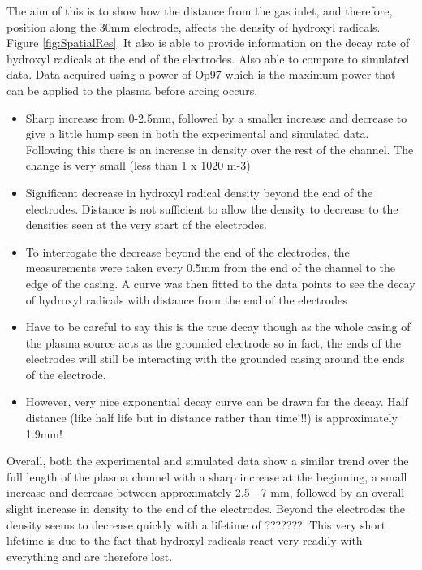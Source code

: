 \documentclass[11pt, oneside]{article}   	%
\begin{document}
The aim of this is to show how the distance from the gas inlet, and therefore, position along the 30mm electrode, affects the density of hydroxyl radicals. Figure \ref{fig:SpatialRes}.
It also is able to provide information on the decay rate of hydroxyl radicals at the end of the electrodes.
Also able to compare to simulated data.
Data acquired using a power of Op97 which is the maximum power that can be applied to the plasma before arcing occurs.
\begin{itemize}
    \item Sharp increase from 0-2.5mm, followed by a smaller increase and decrease to give a little hump seen in both the experimental and simulated data. Following this there is an increase in density over the rest of the channel. The change is very small (less than 1 x 1020 m-3)
   
    \item Significant decrease in hydroxyl radical density beyond the end of the electrodes. Distance is not sufficient to allow the density to decrease to the densities seen at the very start of the electrodes. 
        
    \item To interrogate the decrease beyond the end of the electrodes, the measurements were taken every 0.5mm from the end of the channel to the edge of the casing. A curve was then fitted to the data points to see the decay of hydroxyl radicals with distance from the end of the electrodes
    
    \item Have to be careful to say this is the true decay though as the whole casing of the plasma source acts as the grounded electrode so in fact, the ends of the electrodes will still be interacting with the grounded casing around the ends of the electrode.
    
    \item However, very nice exponential decay curve can be drawn for the decay. Half distance (like half life but in distance rather than time!!!) is approximately 1.9mm!
\end{itemize}

Overall, both the experimental and simulated data show a similar trend over the full length of the plasma channel with a sharp increase at the beginning, a small increase and decrease between approximately 2.5 - 7 mm, followed by an overall slight increase in density to the end of the electrodes.
Beyond the electrodes the density seems to decrease quickly with a lifetime of ???????.
This very short lifetime is due to the fact that hydroxyl radicals react very readily with everything and are therefore lost.
\end{document}
